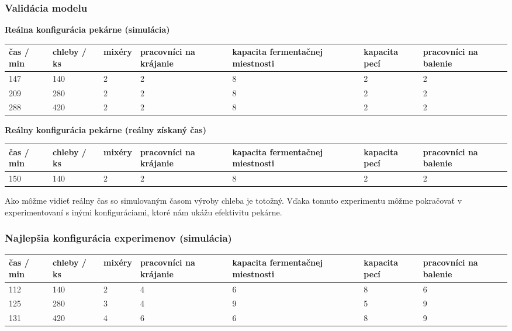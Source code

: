 \documentclass[a4paper, 10pt]{article}
\begin{document}
    \subsubsection{Validácia modelu}
    \textbf{Reálna konfigurácia pekárne (simulácia)}
    \begin{center}
        \begin{tabular}{ |p{2cm}|p{2cm}|p{2cm}|p{2cm}|p{2cm}|p{2cm}|p{2cm}| }
            \hline
            čas / min & chleby / ks & mixéry & pracovníci na krájanie & kapacita fermentačnej miestnosti & kapacita pecí & pracovníci na balenie \\
            \hline\hline
            147 & 140 & 2 & 2 & 8 & 2 & 2  \\ \hline
            209 & 280 & 2 & 2 & 8 & 2 & 2 \\ \hline
            288 & 420 & 2 & 2 & 8 & 2 & 2 \\ \hline
        \end{tabular}
    \end{center}
    \textbf{Reálny konfigurácia pekárne (reálny získaný čas)}
    \begin{center}
        \begin{tabular}{ |p{2cm}|p{2cm}|p{2cm}|p{2cm}|p{2cm}|p{2cm}|p{2cm}| }
            \hline
            čas / min & chleby / ks & mixéry & pracovníci na krájanie & kapacita fermentačnej miestnosti & kapacita pecí & pracovníci na balenie \\
            \hline\hline
            150 & 140 & 2 & 2 & 8 & 2 & 2  \\ \hline
        \end{tabular}
    \end{center}
    Ako môžme vidieť reálny čas so simulovaným časom výroby chleba je totožný. Vďaka tomuto experimentu
    môžme pokračovať v experimentovaní s inými konfiguráciami, ktoré nám ukážu efektivitu pekárne.

    \subsubsection{Najlepšia konfigurácia experimenov (simulácia)}
    \begin{center}
        \begin{tabular}{ |p{2cm}|p{2cm}|p{2cm}|p{2cm}|p{2cm}|p{2cm}|p{2cm}| }
            \hline
            čas / min & chleby / ks & mixéry & pracovníci na krájanie & kapacita fermentačnej miestnosti & kapacita pecí & pracovníci na balenie \\
            \hline\hline
            112 & 140 & 2 & 4 & 6 & 8 & 6  \\ \hline
            125 & 280 & 3 & 4 & 9 & 5 & 9  \\ \hline
            131 & 420 & 4 & 6 & 6 & 8 & 9 \\ \hline
        \end{tabular}
    \end{center}
\end{document}
